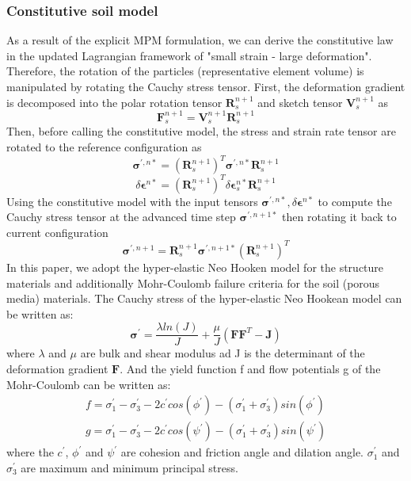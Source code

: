 \documentclass[preprint,12pt]{elsarticle}
\begin{document}
\subsubsection{Constitutive soil model}
As a result of the explicit MPM formulation, we can derive the constitutive law in the updated Lagrangian framework of "small strain - large deformation". Therefore, the rotation of the particles (representative element volume) is manipulated by rotating the Cauchy stress tensor. First, the deformation gradient is decomposed into the polar rotation tensor $\pmb{R}_s^{n+1}$ and sketch tensor $\pmb{V}_s^{n+1}$ as
%
%
\begin{equation}
     \pmb{F}_s^{n+1} = \pmb{V}_s^{n+1} \pmb{R}_s^{n+1}
\end {equation}
%
%
Then, before calling the constitutive model, the stress and strain rate tensor are rotated to the reference configuration as
%
%
\begin{equation}
     \pmb{\sigma}^{\prime,n*} =  (\pmb{R}_s^{n+1})^T \pmb{\sigma}^{\prime,n*} \pmb{R}_s^{n+1}
\end {equation}
%
%
\begin{equation}
    \delta \pmb{\epsilon}^{n*} =  (\pmb{R}_s^{n+1})^T \delta \pmb{\epsilon}_s^{n*} \pmb{R}_s^{n+1}
\end {equation}
%
%
Using the constitutive model with the input tensors $\pmb{\sigma}^{\prime,n*}, \delta \pmb{\epsilon}^{n*}$ to compute the Cauchy stress tensor at the advanced time step $\pmb{\sigma}^{\prime,n+1*}$ then rotating it back to current configuration
%
%
\begin{equation}
    \pmb{\sigma}^{\prime,n+1} =  \pmb{R}_s^{n+1} \pmb{\sigma}^{\prime,n+1*} (\pmb{R}_s^{n+1})^T
\end {equation}
%
%
In this paper, we adopt the hyper-elastic Neo Hooken model for the structure materials and additionally Mohr-Coulomb failure criteria for the soil (porous media) materials. The Cauchy stress of the hyper-elastic Neo Hookean model can be written as:
%
%
\begin{equation}
    \pmb{\sigma}^{\prime} =  \frac{ \lambda ln(J)}{J} + \frac{\mu}{J} (\pmb{F} \pmb{F}^T - \pmb{J})
\end {equation}
%
%
where $\lambda$ and $\mu$ are bulk and shear modulus ad J is the determinant of the deformation gradient $\pmb{F}$. And the yield function f and flow potentials g of the Mohr-Coulomb can be written as:
%
%
\begin{equation}
\begin{gathered}
   f =  \sigma_1^{\prime} -  \sigma_3^{\prime} -2c^{\prime} cos(\phi^{\prime}) - (\sigma_1^{\prime} +  \sigma_3^{\prime})sin(\phi^{\prime})\\
   g =  \sigma_1^{\prime} -  \sigma_3^{\prime} -2c^{\prime} cos(\psi^{\prime}) - (\sigma_1^{\prime} +  \sigma_3^{\prime})sin(\psi^{\prime})
\end {gathered}
\end {equation}
%
%
where the $c^{\prime}$, $\phi^{\prime}$ and $\psi^{\prime}$ are cohesion and friction angle and dilation angle. $\sigma_1^{\prime}$ and $\sigma_3^{\prime}$ are maximum and minimum principal stress.
\end{document}
